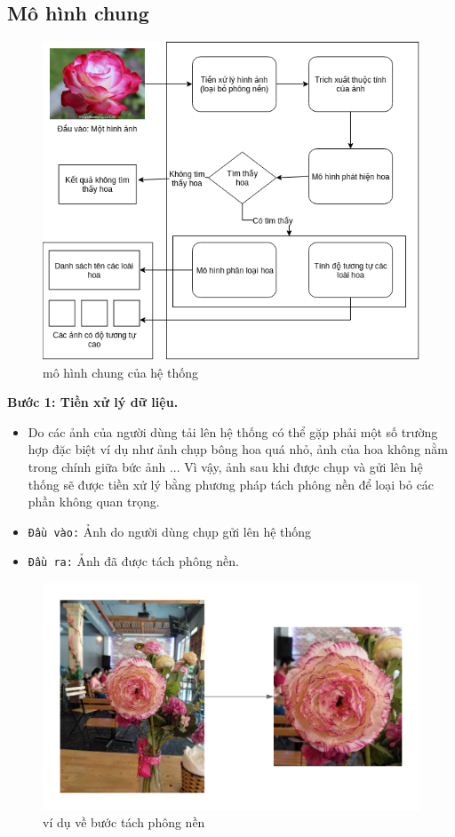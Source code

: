 \documentclass[12pt]{report}
\begin{document}
		\subsection{Mô hình chung}
		\begin{figure}[h]
			\centering
			\includegraphics[scale=0.81]{mohinhchung}
			\caption{mô hình chung của hệ thống}
			\label{fig:mohinhchung}
		\end{figure}
										
		\textbf{Bước 1: Tiền xử lý dữ liệu.} 
		\begin{itemize}
			\item Do các ảnh của người dùng tải lên hệ thống có thể gặp phải một số trường hợp đặc biệt ví dụ như ảnh chụp bông hoa quá nhỏ, ảnh của hoa không nằm trong chính giữa bức ảnh ... Vì vậy, ảnh sau khi được chụp và gửi lên hệ thống sẽ được tiền xử lý bằng phương pháp tách phông nền để loại bỏ các phần không quan trọng.
			\item \texttt{Đầu vào:} Ảnh do người dùng chụp gửi lên hệ thống
			\item \texttt{Đầu ra:} Ảnh đã được tách phông nền.
		\end{itemize}
										
		\begin{figure}[h]
			\centering
			\includegraphics[scale=0.4]{tach_phong_nen}
			\caption{ví dụ về bước tách phông nền}
			\label{fig:tach_phong_nen}
		\end{figure}
										
\end{document}
